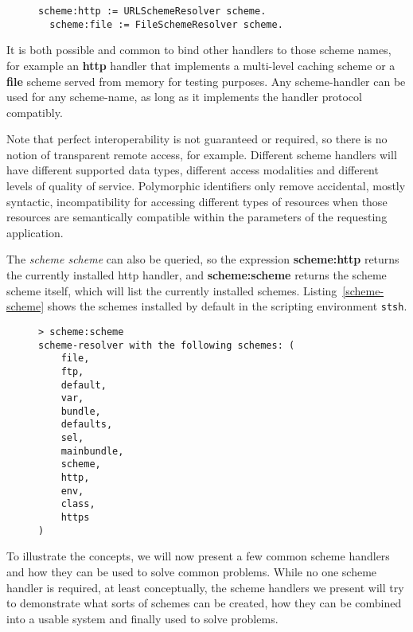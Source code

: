 \documentclass[preprint,authoryear]{acm_proc_article-sp}
\begin{document}
\begin{figure}[htbp]
\begin{lstlisting}[style=L,label=scheme-scheme-http,caption=Binding the http and file schemes.]
  scheme:http := URLSchemeResolver scheme.
  scheme:file := FileSchemeResolver scheme.
\end{lstlisting}
\end{figure}

It is both possible and common to bind other handlers to those scheme
names, for example an {\bf http} handler that implements a multi-level caching scheme
or a {\bf file} scheme served from memory for testing purposes.  Any scheme-handler
can be used for any scheme-name, as long as it implements the handler protocol
compatibly.

Note that perfect interoperability is not guaranteed or required, so there is no notion
of transparent remote access, for example.  Different scheme handlers will have different supported
data types, different access modalities and different levels of quality of service.
Polymorphic identifiers only remove accidental, mostly syntactic, incompatibility for accessing different types
of resources when those resources are semantically compatible within the parameters
of the requesting application.


The {\em scheme scheme} can also be queried,
so the expression {\bf scheme:http} returns the currently installed http handler, and 
{\bf scheme:scheme} returns the scheme scheme itself, which will list the currently
installed schemes.  Listing~\ref{scheme-scheme} shows the schemes installed by
default in the scripting environment {\tt stsh}.

\begin{figure}[htbp]
\begin{lstlisting}[style=L,label=scheme-scheme,caption=List of schemes via scheme:scheme.]
> scheme:scheme 
scheme-resolver with the following schemes: (
    file,
    ftp,
    default,
    var,
    bundle,
    defaults,
    sel,
    mainbundle,
    scheme,
    http,
    env,
    class,
    https
)
\end{lstlisting}
\end{figure}

To illustrate the concepts, we will now present a few common scheme handlers and how they can be
used to solve common problems.  While no one scheme handler is required, at least conceptually,
the scheme handlers we present will try to demonstrate what sorts of schemes can be created,
how they can be combined into a usable system and finally used to solve problems.
\end{document}
